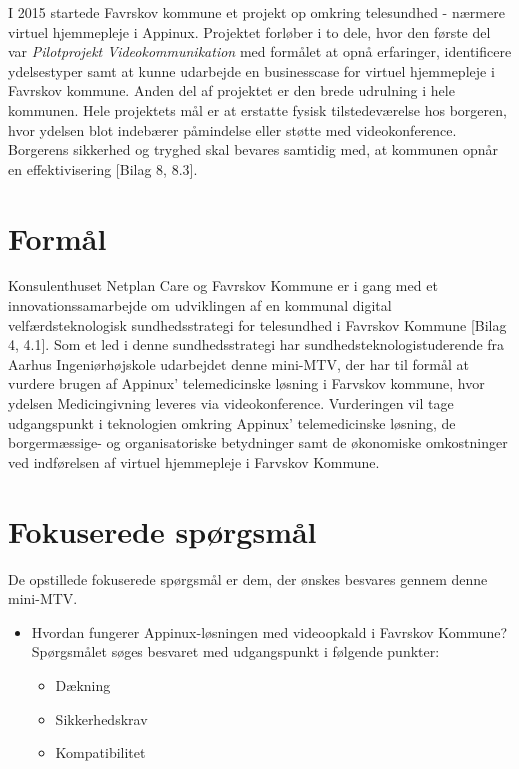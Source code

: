 I 2015 startede Favrskov kommune et projekt op omkring telesundhed - nærmere virtuel hjemmepleje i Appinux. Projektet forløber i to dele, hvor den første del var \textit{Pilotprojekt Videokommunikation} med formålet at opnå erfaringer, identificere ydelsestyper samt at kunne udarbejde en businesscase for virtuel hjemmepleje i Favrskov kommune. Anden del af projektet er den brede udrulning i hele kommunen. Hele projektets mål er at erstatte fysisk tilstedeværelse hos borgeren, hvor ydelsen blot indebærer påmindelse eller støtte med videokonference. Borgerens sikkerhed og tryghed skal bevares samtidig med, at kommunen opnår en effektivisering [Bilag 8, 8.3]. 

\section{Formål}
Konsulenthuset Netplan Care og Favrskov Kommune er i gang med et innovationssamarbejde om udviklingen af en kommunal digital velfærdsteknologisk sundhedsstrategi for telesundhed i Favrskov Kommune [Bilag 4, 4.1]. Som et led i denne sundhedsstrategi har sundhedsteknologistuderende fra Aarhus Ingeniørhøjskole udarbejdet denne mini-MTV, der har til formål at vurdere brugen af Appinux' telemedicinske løsning i Farvskov kommune, hvor ydelsen Medicingivning 
 leveres via videokonference. Vurderingen vil tage udgangspunkt i teknologien omkring Appinux' telemedicinske løsning, de borgermæssige- og organisatoriske betydninger samt de økonomiske omkostninger ved indførelsen af virtuel hjemmepleje i Farvskov Kommune.  

\section{Fokuserede spørgsmål}
De opstillede fokuserede spørgsmål er dem, der ønskes besvares gennem denne mini-MTV. 

\begin{itemize}
	\item Hvordan fungerer Appinux-løsningen med videoopkald i Favrskov Kommune? \\Spørgsmålet søges besvaret med udgangspunkt i følgende punkter:
	\begin{itemize}
	\item Dækning
	\item Sikkerhedskrav
	\item Kompatibilitet 
\end{itemize}
\end{itemize}

